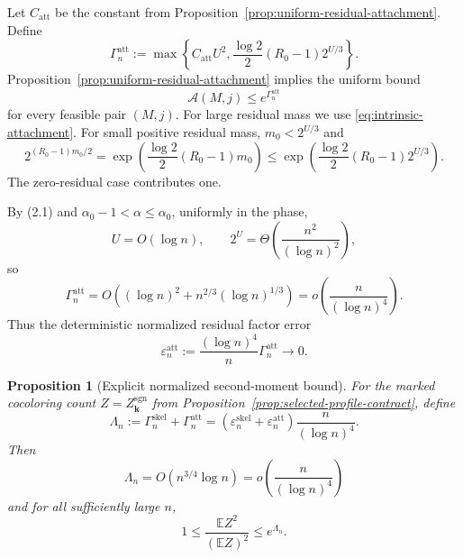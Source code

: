 \documentclass[a4paper,10pt,reqno]{amsart}
\numberwithin{equation}{section}
\theoremstyle{plain}
\newtheorem{proposition}[theorem]{Proposition}
\theoremstyle{remark}
\begin{document}
Let $C_{\mathrm{att}}$ be the constant from
Proposition~\ref{prop:uniform-residual-attachment}.
Define
\begin{equation}
  \Gamma_n^{\mathrm{att}}
  :=
  \max\!\left\{
    C_{\mathrm{att}}U^2,
    \frac{\log 2}{2}(R_0-1)2^{U/3}
  \right\}.
  \label{eq:attachment-ledger}
\end{equation}
Proposition~\ref{prop:uniform-residual-attachment} implies the uniform
bound
\begin{equation}
  \mathcal A(M,j)\le e^{\Gamma_n^{\mathrm{att}}}
  \label{eq:uniform-attachment-exponential}
\end{equation}
for every feasible pair $(M,j)$. For large residual mass we use
\eqref{eq:intrinsic-attachment}. For small positive residual mass,
$m_0<2^{U/3}$ and
\[
  2^{(R_0-1)m_0/2}
  =\exp\!\left(\frac{\log 2}{2}(R_0-1)m_0\right)
  \le\exp\!\left(\frac{\log 2}{2}(R_0-1)2^{U/3}\right).
\]
The zero-residual case contributes one.

By (2.1) and $\alpha_0-1<\alpha\le\alpha_0$, uniformly in the phase,
\[
  U=O(\log n),
  \qquad
  2^U=\Theta\!\left(\frac{n^2}{(\log n)^2}\right),
\]
so
\[
  \Gamma_n^{\mathrm{att}}
  =O\!\left(
    (\log n)^2+n^{2/3}(\log n)^{1/3}
  \right)
  =o\!\left(\frac{n}{(\log n)^4}\right).
\]
Thus the deterministic normalized residual factor error
\begin{equation}
  \varepsilon_n^{\mathrm{att}}
  :=
  \frac{(\log n)^4}{n}\Gamma_n^{\mathrm{att}}
  \longrightarrow0.
  \label{eq:normalized-attachment-error}
\end{equation}

\begin{proposition}[Explicit normalized second-moment bound]
\label{prop:explicit-normalized-second-moment-ledger}
For the marked cocoloring count
$Z=Z_{\mathbf k}^{\mathrm{sgn}}$ from
Proposition~\ref{prop:selected-profile-contract}, define
\begin{equation}
  \Lambda_n
  :=
  \Gamma_n^{\mathrm{skel}}+\Gamma_n^{\mathrm{att}}
  =
  \left(
    \varepsilon_n^{\mathrm{skel}}
    +\varepsilon_n^{\mathrm{att}}
  \right)
  \frac{n}{(\log n)^4}.
  \label{eq:explicit-lambda-ledger}
\end{equation}
Then
\[
  \Lambda_n=O(n^{3/4}\log n)
  =o\!\left(\frac{n}{(\log n)^4}\right)
\]
and
for all sufficiently large $n$,
\begin{equation}
  1
  \le
  \frac{\mathbb E Z^2}{(\mathbb E Z)^2}
  \le e^{\Lambda_n}.
  \label{eq:explicit-second-moment-ledger}
\end{equation}
\end{proposition}
\end{document}

